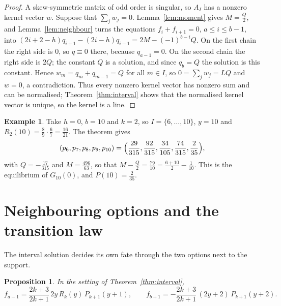 \documentclass[11pt]{article}
\newtheorem{proposition}[theorem]{Proposition}
\theoremstyle{definition}
\newtheorem{example}[theorem]{Example}
\theoremstyle{remark}
\begin{document}
\begin{proof}
A skew-symmetric matrix of odd order is singular, so $A_I$ has a nonzero
kernel vector $w$. Suppose that $\sum_jw_j=0$. Lemma~\ref{lem:moment}
gives $M=\frac Q2$, and Lemma~\ref{lem:neighbour} turns the equations
$f_i+f_{i+1}=0$, $a\le i\le b-1$, into
$(2i+2-h)q_{i+1}-(2i-h)q_{i-1}=2M-(-1)^{b-i}Q$. On the first chain the
right side is $0$, so $q\equiv0$ there, because $q_{a-1}=0$. On the
second chain the right side is $2Q$; the constant $Q$ is a solution, and
since $q_b=Q$ the solution is this constant. Hence $w_m=q_m+q_{m-1}=Q$
for all $m\in I$, so $0=\sum_jw_j=LQ$ and $w=0$, a contradiction. Thus
every nonzero kernel vector has nonzero sum and can be normalised;
Theorem~\ref{thm:interval} shows that the normalised kernel vector is
unique, so the kernel is a line.
\end{proof}

\begin{example}\label{ex:n10}
Take $h=0$, $b=10$ and $k=2$, so $I=\{6,\dots,10\}$, $y=10$ and
$R_2(10)=\frac89\cdot\frac67=\frac{16}{21}$. The theorem gives
\[
(p_6,p_7,p_8,p_9,p_{10})=\Bigl(\frac{29}{315},\frac{92}{315},
\frac{34}{105},\frac{74}{315},\frac{2}{35}\Bigr),
\]
with $Q=-\frac{17}{315}$ and $M=\frac{496}{63}$, so that
$M-\frac Q2=\frac{79}{10}=\frac{6+10}2-\frac1{10}$. This is the
equilibrium of $G_{10}(0)$, and $P(10)=\frac2{35}$.
\end{example}

\section{Neighbouring options and the transition law}\label{sec:structure}

The interval solution decides its own fate through the two options next
to the support.

\begin{proposition}\label{prop:neighbours}
In the setting of Theorem~\ref{thm:interval},
\[
f_{a-1}=\frac{2k+3}{2k+1}\,2y\,R_k(y)\,P_{k+1}(y+1),\qquad
f_{b+1}=-\frac{2k+3}{2k+1}\,(2y+2)\,P_{k+1}(y+2).
\]
\end{proposition}
\end{document}
